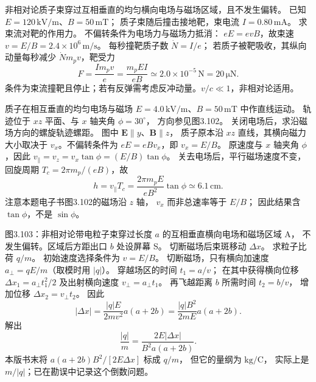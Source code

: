非相对论质子束穿过互相垂直的均匀横向电场与磁场区域，且不发生偏转。
已知 $E=120\,\mathrm{kV/m}$、$B=50\,\mathrm{mT}$；
质子束随后撞击接地靶，束电流 $I=0.80\,\mathrm{mA}$。
求束流对靶的作用力。
\exsolution
不偏转条件为电场力与磁场力抵消：
$eE=evB$，故束速
$v=E/B=2.4\times10^6\,\mathrm{m/s}$。
每秒撞靶质子数 $\dot N=I/e$；
若质子被靶吸收，其纵向动量每秒减少
$\dot N m_pv$，靶受力
\[
\boxed{F=\frac{Im_pv}{e}
=\frac{m_pEI}{eB}
\simeq2.0\times10^{-5}\,\mathrm N
=20\,\mathrm{\mu N}}.
\]
\excheck 条件为束流撞靶且停止；若有反弹需考虑反冲动量。$v/c\ll1$，非相对论适用。

质子在相互垂直的均匀电场与磁场
$E=4.0\,\mathrm{kV/m}$、$B=50\,\mathrm{mT}$
中作直线运动。
轨迹位于 $xz$ 平面、与 $x$ 轴夹角 $\phi=30^\circ$，
方向参见图3.102。
关闭电场后，求沿磁场方向的螺旋轨迹螺距。
\exsolution
图中 $\bm E\parallel y$、$\bm B\parallel z$，
质子原本沿 $xz$ 直线，其横向磁力大小取决于
$v_x$。不偏转条件为 $eE=eBv_x$，即
$v_x=E/B$。
原速度与 $x$ 轴夹角 $\phi$，因此
$v_\parallel=v_z=v_x\tan\phi=(E/B)\tan\phi$。
关去电场后，平行磁场速度不变，
回旋周期 $T_c=2\pi m_p/(eB)$，故
\[
\boxed{h=v_\parallel T_c
=\frac{2\pi m_pE}{eB^2}\tan\phi
\simeq6.1\,\mathrm{cm}}.
\]
\excheck 注意本题电子书图3.102的磁场沿 $z$ 轴，
$v_x$ 而非总速率等于 $E/B$；
因此结果含 $\tan\phi$，不是 $\sin\phi$。

图3.103：非相对论带电粒子束穿过长度 $a$ 的互相垂直横向电场和磁场区域 A，
不发生偏转。区域后方距出口 $b$ 处设屏幕 S。
切断磁场后束斑移动 $\Delta x$。
求粒子比荷 $q/m$。
\exsolution
初始速度选择条件为 $v=E/B$。
切断磁场，只有横向加速度
$a_\perp=qE/m$（取模时用 $|q|$）。
穿越场区的时间 $t_1=a/v$；
在其中获得横向位移
$\Delta x_1=a_\perp t_1^2/2$
及出射横向速度 $v_\perp=a_\perp t_1$。
再飞越距离 $b$ 所需时间 $t_2=b/v$，
增加位移 $\Delta x_2=v_\perp t_2$。
因此
\[
|\Delta x|=\frac{|q|E}{2mv^2}a(a+2b)
=\frac{|q|B^2}{2mE}a(a+2b).
\]
解出
\[
\boxed{\frac{|q|}{m}=
\frac{2E|\Delta x|}{B^2a(a+2b)}}.
\]
\excheck 本版书末将
$a(a+2b)B^2/[2E\Delta x]$ 标成 $q/m$，
但它的量纲为 $\mathrm{kg/C}$，
实际上是 $m/|q|$；已在勘误中记录这个倒数问题。

